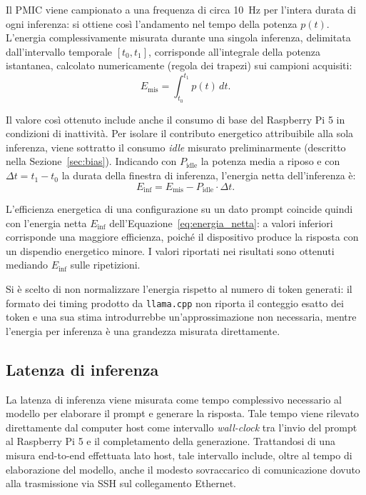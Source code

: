 Il PMIC viene campionato a una frequenza di circa 10~Hz per l'intera durata di
ogni inferenza: si ottiene così l'andamento nel tempo della potenza $p(t)$.
L'energia complessivamente misurata durante una singola inferenza, delimitata
dall'intervallo temporale $[t_0, t_1]$, corrisponde all'integrale della potenza
istantanea, calcolato numericamente (regola dei trapezi) sui campioni acquisiti:
\begin{equation}
    E_{\text{mis}} = \int_{t_0}^{t_1} p(t)\, dt .
    \label{eq:energia_misurata}
\end{equation}

Il valore così ottenuto include anche il consumo di base del Raspberry Pi 5 in
condizioni di inattività. Per isolare il contributo energetico attribuibile alla
sola inferenza, viene sottratto il consumo \textit{idle} misurato preliminarmente
(descritto nella Sezione~\ref{sec:bias}). Indicando con $P_{\text{idle}}$ la
potenza media a riposo e con $\Delta t = t_1 - t_0$ la durata della finestra di
inferenza, l'energia netta dell'inferenza è:
\begin{equation}
    E_{\text{inf}} = E_{\text{mis}} - P_{\text{idle}} \cdot \Delta t .
    \label{eq:energia_netta}
\end{equation}

L'efficienza energetica di una configurazione su un dato prompt coincide quindi
con l'energia netta $E_{\text{inf}}$ dell'Equazione~\ref{eq:energia_netta}: a
valori inferiori corrisponde una maggiore efficienza, poiché il dispositivo
produce la risposta con un dispendio energetico minore. I valori riportati nei
risultati sono ottenuti mediando $E_{\text{inf}}$ sulle ripetizioni.

Si è scelto di non normalizzare l'energia rispetto al numero di token generati:
il formato dei timing prodotto da \texttt{llama.cpp} non riporta il conteggio
esatto dei token e una sua stima introdurrebbe un'approssimazione non necessaria,
mentre l'energia per inferenza è una grandezza misurata direttamente.

\subsection{Latenza di inferenza}

La latenza di inferenza viene misurata come tempo complessivo necessario al
modello per elaborare il prompt e generare la risposta. Tale tempo viene rilevato
direttamente dal computer host come intervallo \textit{wall-clock} tra l'invio del
prompt al Raspberry Pi 5 e il completamento della generazione. Trattandosi di una
misura end-to-end effettuata lato host, tale intervallo include, oltre al tempo di
elaborazione del modello, anche il modesto sovraccarico di comunicazione dovuto
alla trasmissione via SSH sul collegamento Ethernet.

